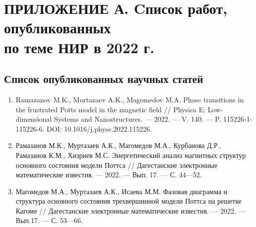 \chapter{ПРИЛОЖЕНИЕ А. Cписок работ, опубликованных \texorpdfstring{\\ }{} по теме НИР в 2022 г.}


\section*{Список опубликованных научных статей}

\begin{enumerate}[1]





    \item
    Ramazanov M.K., Murtazaev A.K., Magomedov M.A.
    Phase transitions in the frustrated Potts model in the magnetic field
    //
    Physica E: Low-dimensional Systems and Nanostructures.
    --- 2022.
    --- V. 140.
    --- P. 115226-1-115226-6. DOI: 10.1016/j.physe.2022.115226.

    \item
    Рамазанов М.К., Муртазаев А.К., Магомедов М.А., Курбанова Д.Р., Рамазанов К.М., Хизриев М.С.
    Энергетический анализ магнитных структур основного состояния модели Поттса
    //
    Дагестанские электронные математические известия.
    --- 2022.
    --- Вып. 17.
    --- С. 44---52.

    \item
    Магомедов М.А., Муртазаев А.К., Исаева М.М.
    Фазовая диаграмма и структура основного состояния трехвершинной модели Поттса на решетке Кагоме
    //
    Дагестанские электронные математические известия.
    --- 2022.
    --- Вып.17.
    --- С. 53---66.


\end{enumerate}
